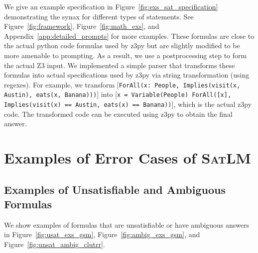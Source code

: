 \documentclass{article}
\theoremstyle{definition}
\newcommand\ttsmall[1]{\texttt{\small #1}}
\newcommand{\satlm}{\textsc{SatLM}}
\begin{document}
We give an example specification in Figure~\ref{fig:exs_sat_specification} demonstrating the synax for different types of statements. See Figure~\ref{fig:framework}, Figure~\ref{fig:math_exs}, and Appendix~\ref{app:detailed_prompts} for more examples. These formulas are close to the actual python code formulas used by z3py but are slightly modified to be more amenable to prompting. As a result, we use a postprocessing step to form the actual Z3 input. We implemented a simple parser that transforms these formulas into actual specifications used by z3py via string transformation (using regexes). For example, we transform [\ttsmall{ForAll(x: People, Implies(visit(x, Austin), eats(x, Banana)))}] into [\ttsmall{x = Variable(People) ForAll([x], Implies(visit(x) == Austin, eats(x) == Banana))}], which is the actual z3py code.
The transformed code can be executed using z3py to obtain the final answer. 




\newpage

\section{Examples of Error Cases of \satlm{}}
\label{app:exs_sat_errors}


\subsection{Examples of Unsatisfiable and Ambiguous Formulas}
We show examples of formulas that are unsatisfiable or have ambiguous answers in Figure~\ref{fig:usat_exs_gsm}, Figure~\ref{fig:ambig_exs_gsm}, and Figure~\ref{fig:unsat_ambig_clutrr}.
\end{document}
